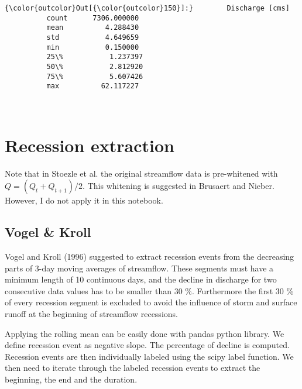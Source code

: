 \documentclass[11pt]{article}
\begin{document}
\begin{Verbatim}[commandchars=\\\{\}]
{\color{outcolor}Out[{\color{outcolor}150}]:}        Discharge [cms]
          count      7306.000000
          mean          4.288430
          std           4.649659
          min           0.150000
          25\%           1.237397
          50\%           2.812920
          75\%           5.607426
          max          62.117227
\end{Verbatim}
            
    \begin{center}
    \end{center}
    { \hspace*{\fill} \\}
    
    \section{Recession extraction}\label{recession-extraction}

Note that in Stoezle et al. the original streamflow data is pre-whitened
with \(Q = (Q_t + Q_{t+1})/2\). This whitening is suggested in Brusaert
and Nieber. However, I do not apply it in this notebook.

\subsection{Vogel \& Kroll}\label{vogel-kroll}

Vogel and Kroll (1996) suggested to extract recession events from the
decreasing parts of 3-day moving averages of streamflow. These segments
must have a minimum length of 10 continuous days, and the decline in
discharge for two consecutive data values has to be smaller than 30 \%.
Furthermore the first 30 \% of every recession segment is excluded to
avoid the influence of storm and surface runoff at the beginning of
streamflow recessions.

Applying the rolling mean can be easily done with pandas python library.
We define recession event as negative slope. The percentage of decline
is computed. Recession events are then individually labeled using the
scipy label function. We then need to iterate through the labeled
recession events to extract the beginning, the end and the duration.
\end{document}
